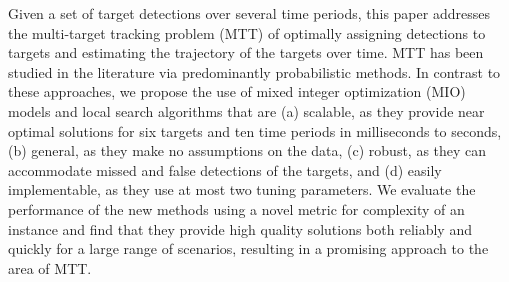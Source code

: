 Given a set of target detections over several time periods, this paper addresses the multi-target tracking problem (MTT) of optimally assigning detections to targets and estimating the trajectory of the targets over time. MTT has been studied in the literature via predominantly probabilistic methods. In contrast to these approaches, we propose the use of mixed integer optimization (MIO) models and local search algorithms that are (a) scalable, as they provide near optimal solutions for six targets and ten time periods in milliseconds to seconds, (b) general, as they make no assumptions on the data, (c) robust, as they can accommodate missed and false detections of the targets, and (d) easily implementable, as they use at most two tuning parameters. We evaluate the performance of the new methods using a novel metric for complexity of an instance and find that they provide high quality solutions both reliably and quickly for a large range of scenarios, resulting in a promising approach to the area of MTT. 